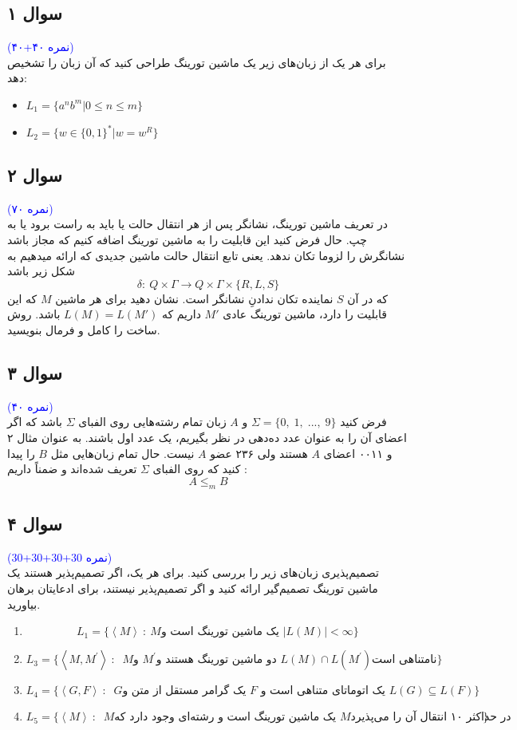 \documentclass{scribe-or}
\begin{document}
\subsection*{سوال ۱}
\textcolor{blue}{(۴۰+۴۰ نمره)}\\
برای هر یک از زبان‌های زیر یک ماشین تورینگ طراحی کنید که آن زبان را تشخیص دهد:
\begin{itemize}
\item 
$L_1 = \{a^nb^m | 0 \leq n \leq m\}$
\item 
$L_2 = \{w \in \{0 , 1\}^* | w = w^R\}$
\end{itemize}

\subsection*{سوال ۲}
\textcolor{blue}{(۷۰ نمره)}\\
در تعریف ماشین تورینگ، نشانگر%
پس از هر انتقال حالت یا باید به راست برود یا به چپ. حال فرض کنید این قابلیت را به ماشین تورینگ اضافه کنیم که مجاز باشد نشانگرش را لزوما تکان ندهد. یعنی تابع انتقال حالت ماشین جدیدی که ارائه میدهیم به شکل زیر باشد
$$\delta: \ Q\times \Gamma \rightarrow Q\times \Gamma \times \{R,L,S\}$$
که در آن $S$ نماینده تکان ندادنِ نشانگر است. نشان دهید برای هر ماشین $M$ که این قابلیت را دارد، ماشین تورینگ عادی $M'$ داریم که $L(M)=L(M')$ باشد. روش ساخت را کامل و فرمال بنویسید.

\subsection*{سوال ۳}
\textcolor{blue}{(۴۰ نمره)}\\
فرض کنید 
$\Sigma=\{0,\;1,\;...,\;9\}$
و $ A$ زبان تمام رشته‌هایی روی الفبای $\Sigma$ باشد که اگر اعضای آن را به عنوان عدد ده‌دهی در نظر بگیریم، یک عدد اول باشند. به عنوان مثال ۲ و ۰۰۱۱ اعضای $A$ هستند ولی ۲۳۶ عضو $A$ نیست. حال تمام زبان‌هایی مثل $B$ را پیدا کنید که روی الفبای $\Sigma$ تعریف شده‌اند و ضمناً داریم :
$$A \leq_m B$$
\subsection*{سوال ۴}
\textcolor{blue}{(30+30+30+30 نمره)}\\
تصمیم‌پذیری زبان‌های زیر را بررسی کنید. برای هر یک، اگر تصمیم‌پذیر هستند یک ماشین تورینگ تصمیم‌گیر ارائه کنید و اگر تصمیم‌پذیر نیستند، برای ادعایتان برهان بیاورید.
\begin{enumerate}
\item 
$$L_1=\{\left\langle M \right\rangle ~:~ \text{
$M$
یک ماشین تورینگ است و 
$|L(M)|<\infty$}\}$$
\item 
$$L_3=\{\left\langle M , M^\prime\right\rangle ~:~\text{
	$M$
	و 
	$M^\prime$
	دو ماشین تورینگ هستند و 
	$L(M)\cap L(M^\prime)$
نامتناهی است}\}$$
\item 
$$L_4=\{\left\langle G , F\right\rangle ~:~\text{
	$G$
	یک گرامر مستقل از متن و $F$ یک اتوماتای متناهی است و  
	$L(G)\subseteq L(F)$}\}$$
\item 
$$L_5=\{\left\langle M \right\rangle ~:~ \text{
	$M$
	یک ماشین تورینگ است و رشته‌ای وجود دارد که 
	$M$
	در حداکثر ۱۰ انتقال آن را می‌پذیرد}
	\}$$ 
\end{enumerate}
\end{document}
